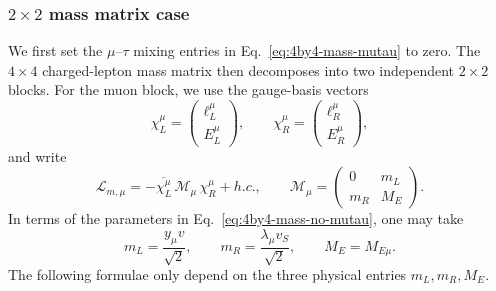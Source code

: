 \documentclass[onecolumn, aps, nofootinbib, prd, preprint, floats, floatfix, amsmath, amssymb, superscriptaddress, preprintnumbers]{revtex4-1}
\begin{document}
\subsubsection{$2 \times 2$ mass matrix case}
We first set the $\mu$--$\tau$ mixing entries in Eq.~\eqref{eq:4by4-mass-mutau} to zero. The $4\times4$ charged-lepton mass matrix then decomposes into two independent $2\times2$ blocks. For the muon block, we use the gauge-basis vectors
\begin{equation}
\chi^\mu_L =
\begin{pmatrix}
\ell^\mu_L\\
E^\mu_L
\end{pmatrix},
\qquad
\chi^\mu_R =
\begin{pmatrix}
\ell^\mu_R\\
E^\mu_R
\end{pmatrix},
\end{equation}
and write
\begin{equation}
\mathcal{L}_{m,\mu}
=-\overline{\chi^\mu_L}\,\mathcal{M}_\mu\,\chi^\mu_R+h.c.,
\qquad
\mathcal{M}_\mu =
\begin{pmatrix}
0 & m_L\\
m_R & M_E
\end{pmatrix}.
\label{eq:mu-2by2-mass}
\end{equation}
In terms of the parameters in Eq.~\eqref{eq:4by4-mass-no-mutau}, one may take
\begin{equation}
m_L=\frac{y_\mu v}{\sqrt2},\qquad
m_R=\frac{\lambda_\mu v_S}{\sqrt2},\qquad
M_E=M_{E\mu}.
\end{equation}
The following formulae only depend on the three physical entries $m_L,m_R,M_E$.
\end{document}
